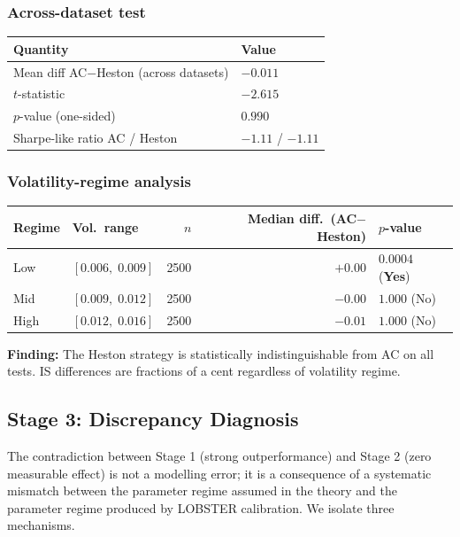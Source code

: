 \documentclass[11pt]{article}
\begin{document}
\subsubsection*{Across-dataset test}

\begin{center}
\begin{tabular}{ll}
\toprule
Quantity & Value \\
\midrule
Mean diff AC$-$Heston (across datasets) & $-0.011$ \\
$t$-statistic & $-2.615$ \\
$p$-value (one-sided) & $0.990$ \\
Sharpe-like ratio AC / Heston & $-1.11$ / $-1.11$ \\
\bottomrule
\end{tabular}
\end{center}

\subsubsection*{Volatility-regime analysis}

\begin{center}
\begin{tabular}{llrrl}
\toprule
Regime & Vol.\ range & $n$ & Median diff.\ (AC$-$Heston) & $p$-value \\
\midrule
Low  & $[0.006,\; 0.009]$ & 2500 & $+0.00$ & $0.0004$ (\textbf{Yes}) \\
Mid  & $[0.009,\; 0.012]$ & 2500 & $-0.00$ & $1.000$ (No) \\
High & $[0.012,\; 0.016]$ & 2500 & $-0.01$ & $1.000$ (No) \\
\bottomrule
\end{tabular}
\end{center}

\noindent
\textbf{Finding:} The Heston strategy is statistically indistinguishable from AC on
all tests. IS differences are fractions of a cent regardless of volatility regime.

\subsection{Stage 3: Discrepancy Diagnosis}
\label{sec:diagnosis}

The contradiction between Stage 1 (strong outperformance) and Stage 2 (zero measurable
effect) is not a modelling error; it is a consequence of a systematic mismatch between the
parameter regime assumed in the theory and the parameter regime produced by LOBSTER
calibration. We isolate three mechanisms.
\end{document}
